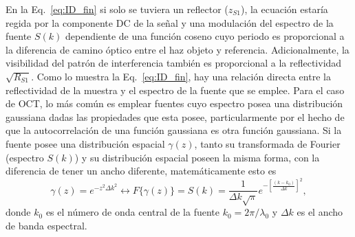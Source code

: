 


En la Eq.~\ref{eq:ID_fin} si solo se tuviera un reflector ($z_{S1}$), la ecuación estaría regida por la componente DC de la señal y una modulación del espectro de la fuente $S(k)$ dependiente de una función coseno cuyo periodo es proporcional a la diferencia de camino óptico entre el haz objeto y referencia. Adicionalmente, la visibilidad del patrón de interferencia también es proporcional a la reflectividad $\sqrt{R_{S1}}$. Como lo muestra la Eq.~\ref{eq:ID_fin}, hay una relación directa entre la reflectividad de la muestra y el espectro de la fuente que se emplee. Para el caso de OCT, lo más común es emplear fuentes cuyo espectro posea una distribución gaussiana dadas las propiedades que esta posee, particularmente por el hecho de que la autocorrelación de una función gaussiana es otra función gaussiana. Si la fuente posee una distribución espacial $\gamma(z)$, tanto su transformada de Fourier (espectro $S(k)$) y su distribución espacial poseen la misma forma, con la diferencia de tener un ancho diferente, matemáticamente esto es
\begin{equation}
	\gamma (z) = e^{-z^2\Delta k^2} \leftrightarrow F\{\gamma (z)\} = S(k) = \frac{1}{\Delta k \sqrt{\pi}} e^{-\left[\frac{(k-k_0)}{\Delta k}\right]^2},
\end{equation}
\noindent donde $k_0$ es el número de onda central de la fuente $k_0 = 2\pi / \lambda_0$ y $\Delta k$ es el ancho de banda espectral.


